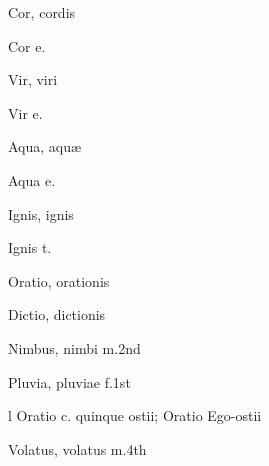  {\mktsStyleItalic{}Cor\/}, cordis


 {\mktsStyleItalic{}Cor e.\/}


 {\mktsStyleItalic{}Vir\/}, viri


 {\mktsStyleItalic{}Vir e.\/}


 {\mktsStyleItalic{}Aqua\/}, aquæ


 {\mktsStyleItalic{}Aqua e.\/}


 {\mktsStyleItalic{}Ignis\/}, ignis


 {\mktsStyleItalic{}Ignis t.\/}


 {\mktsStyleItalic{}Oratio\/}, orationis


 {\mktsStyleItalic{}Dictio\/}, dictionis


 {\mktsStyleItalic{}Nimbus\/}, nimbi {\mktsStyleItalic{}m.2nd\/}


 {\mktsStyleItalic{}Pluvia\/}, pluviae {\mktsStyleItalic{}f.1st\/}


 {} {\mktsStyleItalic{}l Oratio c. quinque ostii\/}; {\mktsStyleItalic{}Oratio Ego-ostii\/}


 {\mktsStyleItalic{}Volatus\/}, volatus {\mktsStyleItalic{}m.4th\/}



